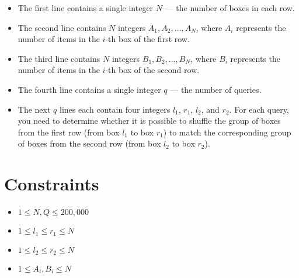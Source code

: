 \begin{itemize}
    \item The first line contains a single integer \( N \) --- the number of boxes in each row.
    \item The second line contains \( N \) integers \( A_1, A_2, \dots, A_N \), where \( A_i \) represents the number of items in the \( i \)-th box of the first row.
    \item The third line contains \( N \) integers \( B_1, B_2, \dots, B_N \), where \( B_i \) represents the number of items in the \( i \)-th box of the second row.
    \item The fourth line contains a single integer \( q \) --- the number of queries.
    \item The next \( q \) lines each contain four integers \( l_1 \), \( r_1 \), \( l_2 \), and \( r_2 \). For each query, you need to determine whether it is possible to shuffle the group of boxes from the first row (from box \( l_1 \) to box \( r_1 \)) to match the corresponding group of boxes from the second row (from box \( l_2 \) to box \( r_2 \)).
\end{itemize}

\section*{Constraints}

\begin{itemize}
    \item \( 1 \leq N, Q \leq 200,000 \)
    \item \( 1 \leq l_1 \leq r_1 \leq N \)
    \item \( 1 \leq l_2 \leq r_2 \leq N \)
    \item \( 1 \leq A_i, B_i \leq N \)
\end{itemize}